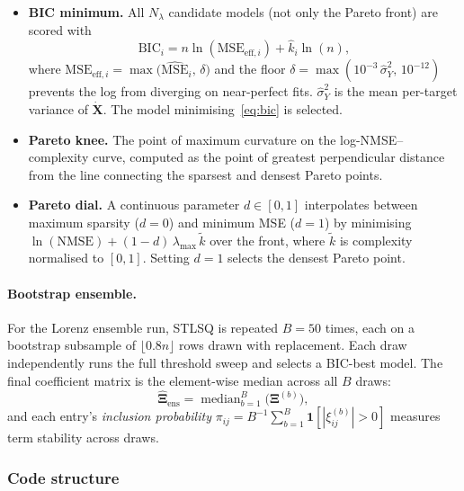 \documentclass[12pt]{article}
\begin{document}
\begin{itemize}
  \item \textbf{BIC minimum.}  All $N_\lambda$ candidate models (not only the
    Pareto front) are scored with
    \begin{equation}
      \mathrm{BIC}_i = n\ln(\mathrm{MSE}_{\mathrm{eff},i})
                       + \hat{k}_i\ln(n),
      \label{eq:bic}
    \end{equation}
    where $\mathrm{MSE}_{\mathrm{eff},i} = \max\!\bigl(\widehat{\mathrm{MSE}}_i,\,
    \delta\bigr)$ and the floor $\delta = \max(10^{-3}\,\hat{\sigma}^{2}_Y,\,
    10^{-12})$ prevents the log from diverging on near-perfect fits.
    $\hat{\sigma}^{2}_Y$ is the mean per-target variance of $\dot{\mathbf{X}}$.
    The model minimising~\eqref{eq:bic} is selected.

  \item \textbf{Pareto knee.}  The point of maximum curvature on the
    log-NMSE--complexity curve, computed as the point of greatest perpendicular
    distance from the line connecting the sparsest and densest Pareto points.

  \item \textbf{Pareto dial.}  A continuous parameter $d \in [0, 1]$
    interpolates between maximum sparsity ($d = 0$) and minimum MSE ($d = 1$)
    by minimising $\ln(\mathrm{NMSE}) + (1-d)\,\lambda_{\mathrm{max}}\,
    \tilde{k}$ over the front, where $\tilde{k}$ is complexity normalised
    to $[0,1]$.  Setting $d = 1$ selects the densest Pareto point.
\end{itemize}

\paragraph{Bootstrap ensemble.}
For the Lorenz ensemble run, STLSQ is repeated $B = 50$ times, each on a
bootstrap subsample of $\lfloor 0.8n \rfloor$ rows drawn with replacement.
Each draw independently runs the full threshold sweep and selects a BIC-best
model.  The final coefficient matrix is the element-wise median across all
$B$ draws:
\begin{equation}
  \hat{\boldsymbol{\Xi}}_{\mathrm{ens}}
  = \operatorname{median}_{b=1}^{B}\bigl(\boldsymbol{\Xi}^{(b)}\bigr),
  \label{eq:ensemble}
\end{equation}
and each entry's \emph{inclusion probability}
$\pi_{ij} = B^{-1}\sum_{b=1}^{B}\mathbf{1}[|\xi^{(b)}_{ij}|>0]$
measures term stability across draws.

\subsubsection*{Code structure}
\end{document}

